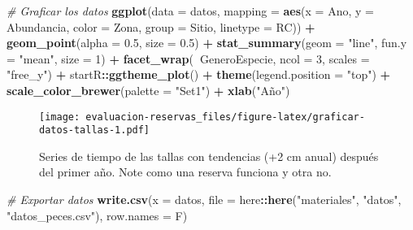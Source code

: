 \documentclass[]{krantz}
\newenvironment{Shaded}{\begin{snugshade}}{\end{snugshade}}
\newcommand{\CommentTok}[1]{\textcolor[rgb]{0.56,0.35,0.01}{\textit{#1}}}
\newcommand{\DataTypeTok}[1]{\textcolor[rgb]{0.13,0.29,0.53}{#1}}
\newcommand{\DecValTok}[1]{\textcolor[rgb]{0.00,0.00,0.81}{#1}}
\newcommand{\FloatTok}[1]{\textcolor[rgb]{0.00,0.00,0.81}{#1}}
\newcommand{\KeywordTok}[1]{\textcolor[rgb]{0.13,0.29,0.53}{\textbf{#1}}}
\newcommand{\NormalTok}[1]{#1}
\newcommand{\OperatorTok}[1]{\textcolor[rgb]{0.81,0.36,0.00}{\textbf{#1}}}
\newcommand{\StringTok}[1]{\textcolor[rgb]{0.31,0.60,0.02}{#1}}
\begin{document}
\begin{Shaded}
\begin{Highlighting}[]
\CommentTok{# Graficar los datos}
\KeywordTok{ggplot}\NormalTok{(}\DataTypeTok{data =}\NormalTok{ datos,}
       \DataTypeTok{mapping =} \KeywordTok{aes}\NormalTok{(}\DataTypeTok{x =}\NormalTok{ Ano, }\DataTypeTok{y =}\NormalTok{ Abundancia,}
                     \DataTypeTok{color =}\NormalTok{ Zona, }\DataTypeTok{group =}\NormalTok{ Sitio, }\DataTypeTok{linetype =}\NormalTok{ RC)) }\OperatorTok{+}
\StringTok{  }\KeywordTok{geom_point}\NormalTok{(}\DataTypeTok{alpha =} \FloatTok{0.5}\NormalTok{, }\DataTypeTok{size =} \FloatTok{0.5}\NormalTok{) }\OperatorTok{+}
\StringTok{  }\KeywordTok{stat_summary}\NormalTok{(}\DataTypeTok{geom =} \StringTok{"line"}\NormalTok{, }\DataTypeTok{fun.y =} \StringTok{"mean"}\NormalTok{, }\DataTypeTok{size =} \DecValTok{1}\NormalTok{) }\OperatorTok{+}
\StringTok{  }\KeywordTok{facet_wrap}\NormalTok{(}\OperatorTok{~}\NormalTok{GeneroEspecie, }\DataTypeTok{ncol =} \DecValTok{3}\NormalTok{, }\DataTypeTok{scales =} \StringTok{"free_y"}\NormalTok{) }\OperatorTok{+}
\StringTok{  }\NormalTok{startR}\OperatorTok{::}\KeywordTok{ggtheme_plot}\NormalTok{() }\OperatorTok{+}
\StringTok{  }\KeywordTok{theme}\NormalTok{(}\DataTypeTok{legend.position =} \StringTok{"top"}\NormalTok{) }\OperatorTok{+}
\StringTok{  }\KeywordTok{scale_color_brewer}\NormalTok{(}\DataTypeTok{palette =} \StringTok{"Set1"}\NormalTok{) }\OperatorTok{+}
\StringTok{  }\KeywordTok{xlab}\NormalTok{(}\StringTok{"Año"}\NormalTok{)}
\end{Highlighting}
\end{Shaded}

\begin{figure}
\centering
\texttt{[image: evaluacion-reservas\_files/figure-latex/graficar-datos-tallas-1.pdf]}
\caption{\label{fig:graficar-datos-tallas}Series de tiempo de las tallas con tendencias (+2 cm anual) después del primer año. Note como una reserva funciona y otra no.}
\end{figure}

\begin{Shaded}
\begin{Highlighting}[]
\CommentTok{# Exportar datos}
\KeywordTok{write.csv}\NormalTok{(}\DataTypeTok{x =}\NormalTok{ datos,}
          \DataTypeTok{file =}\NormalTok{ here}\OperatorTok{::}\KeywordTok{here}\NormalTok{(}\StringTok{"materiales"}\NormalTok{, }\StringTok{"datos"}\NormalTok{, }\StringTok{"datos_peces.csv"}\NormalTok{),}
          \DataTypeTok{row.names =}\NormalTok{ F)}
\end{Highlighting}
\end{Shaded}
\end{document}
